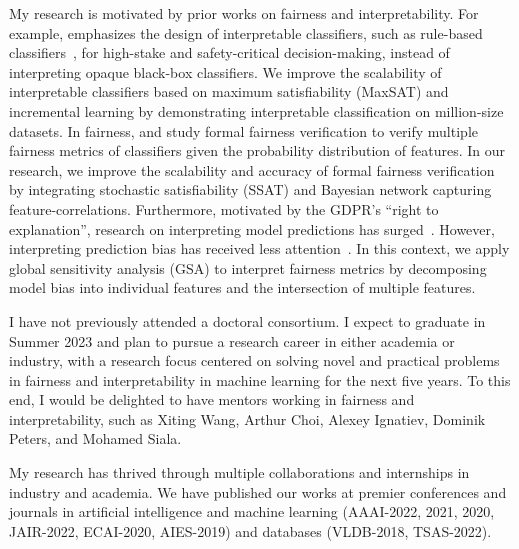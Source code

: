 \documentclass[a4paper,10pt]{article}
\newcommand{\blue}[1]{\textcolor{blue}{#1}}
\begin{document}
	\vspace{1em}
	My research is motivated by prior works on fairness and interpretability. For example, \cite{rudin2019stop} emphasizes the design of interpretable classifiers, such as rule-based classifiers~\citep{lakkaraju2016interpretable}, for high-stake and safety-critical decision-making, instead of interpreting opaque black-box classifiers. We improve the scalability of interpretable classifiers based on maximum satisfiability (MaxSAT) and incremental learning by demonstrating interpretable classification on million-size datasets. In fairness, \cite{albarghouthi2017fairsquare} and \cite{bastani2019probabilistic} study formal fairness verification to verify multiple fairness metrics of classifiers given the probability distribution of features. In our research, we improve the scalability and accuracy of formal fairness verification by integrating stochastic satisfiability (SSAT) and Bayesian network capturing feature-correlations. Furthermore, motivated by the GDPR's ``right to explanation'', research on interpreting model predictions has surged~\citep{lundberg2017unified}. However, interpreting prediction bias has received less attention~\citep{lundberg2020explaining}. In this context, we apply global sensitivity analysis (GSA) to interpret fairness metrics by decomposing model bias into individual features and the intersection of multiple features.
	
	\vspace{1em}
	
	
   I have not previously attended a doctoral consortium. I expect to graduate in Summer 2023 and plan to pursue a research career in either academia or industry, with a research focus centered on solving novel and practical problems in fairness and interpretability in machine learning for the next five years. To this end, I would be delighted to have mentors working in fairness and interpretability, such as Xiting Wang, Arthur Choi, Alexey Ignatiev, Dominik Peters, and Mohamed Siala.
	
	
	\vspace{1em}
	My research has thrived through multiple collaborations and internships in industry and academia. We have published our works at premier conferences and journals in artificial intelligence and machine learning (AAAI-2022, 2021, 2020, JAIR-2022, ECAI-2020, AIES-2019) and databases (VLDB-2018, TSAS-2022).
	
	
\end{document}
